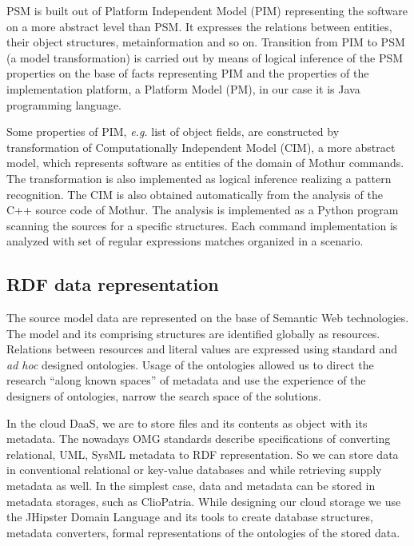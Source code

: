 \documentclass[a4paper]{jpconf}
\begin{document}
PSM is built out of Platform Independent Model (PIM) representing the software on a more abstract level than PSM.  It expresses the relations between entities, their object structures, metainformation and so on.  Transition from PIM to PSM (a model transformation) is carried out by means of logical inference of the PSM properties on the base of facts representing PIM and the properties of the implementation platform, a Platform Model (PM), in our case it is Java programming language.

Some properties of PIM, \emph{e.g.} list of object fields, are constructed by transformation of Computationally Independent Model (CIM), a more abstract model, which represents software as entities of the domain of Mothur commands.  The transformation is also implemented as logical inference realizing a pattern recognition.  The CIM is also obtained automatically from the analysis of the C++ source code of Mothur.  The analysis is implemented as a Python program scanning the sources for a specific structures.  Each command implementation is analyzed with set of regular expressions matches organized in a scenario.

\subsection{RDF data representation}

The source model data are represented on the base of Semantic Web technologies.  The model and its comprising structures are identified globally as resources.  Relations between resources and literal values are expressed using standard and \emph{ad hoc} designed ontologies.  Usage of the ontologies allowed us to direct the research ``along known spaces'' of metadata and use the experience of the designers of ontologies, narrow the search space of the solutions.

In the cloud DaaS, we are to store files and its contents as object with its metadata.  The nowadays OMG standards describe specifications of converting relational, UML, SysML metadata to RDF representation.  So we can store data in conventional relational or key-value databases and while retrieving supply metadata as well.  In the simplest case, data and metadata can be stored in metadata storages, such as ClioPatria.  While designing our cloud storage we use the JHipster Domain Language \cite{jhipster} and its tools to create database structures, metadata converters, formal representations of the ontologies of the stored data.
\end{document}

